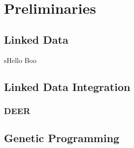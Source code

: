 \chapter{Preliminaries}
\section{Linked Data}
sHello Boo
\section{Linked Data Integration}
\subsection{DEER}
\section{Genetic Programming}